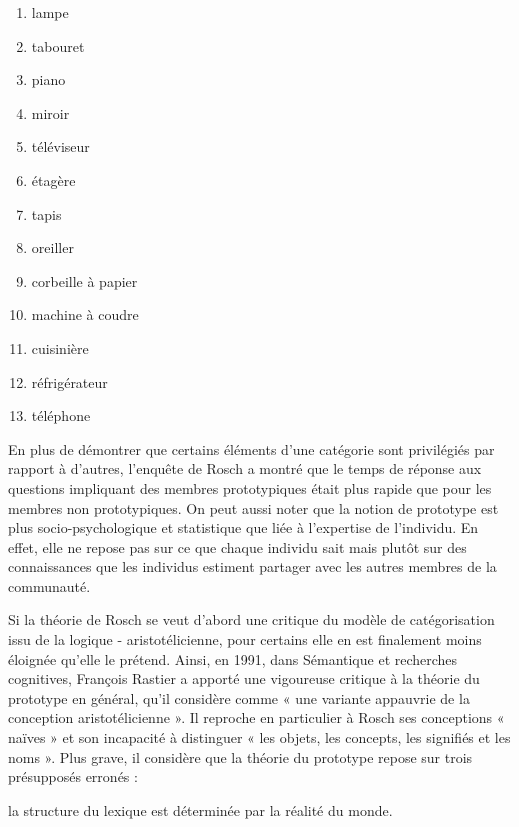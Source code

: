 
\begin{enumerate}[label=\arabic*.,start=17,nosep]
\item lampe
\item tabouret
\item piano
\item miroir
\item téléviseur
\item étagère
\item tapis
\item oreiller
\item corbeille à papier
\item machine à coudre
\item cuisinière
\item réfrigérateur
\item téléphone
\end{enumerate}

En plus de démontrer que certains éléments d’une catégorie sont privilégiés par rapport à d’autres, l'enquête de Rosch a montré que le temps de réponse aux questions impliquant des membres prototypiques était plus rapide que pour les membres non prototypiques. On peut aussi noter que la notion de prototype est plus socio-psychologique et statistique que liée à l’expertise de l’individu. En effet, elle ne repose pas sur ce que chaque individu sait mais plutôt sur des connaissances que les individus estiment partager avec les autres membres de la communauté.\par

 Si la théorie de Rosch se veut d’abord une critique du modèle de catégorisation issu de la logique - aristotélicienne, pour certains elle en est finalement moins éloignée qu’elle le prétend. Ainsi, en 1991, dans Sémantique et recherches cognitives, François Rastier a apporté une vigoureuse critique à la théorie du prototype en général, qu’il considère comme « une variante appauvrie de la conception aristotélicienne ». Il reproche en particulier à Rosch ses conceptions « naïves » et son incapacité à distinguer « les objets, les concepts, les signifiés et les noms ». Plus grave, il considère que la théorie du prototype repose sur trois présupposés erronés :\par

\noindent{\color{BellaTeal}$\diamond$}\hspace{.6em}la structure du lexique est déterminée par la réalité du monde.\par

